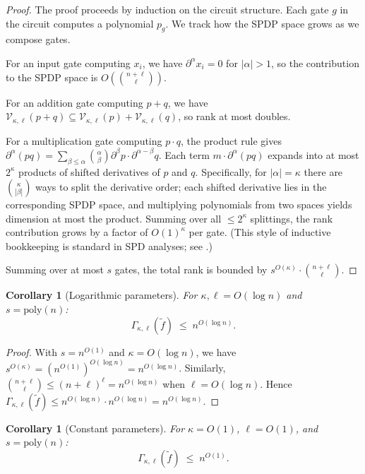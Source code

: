 \documentclass[12pt]{article}
\newtheorem{corollary}[theorem]{Corollary}
\theoremstyle{definition}
\theoremstyle{remark}
\newcommand{\poly}{\mathrm{poly}}
\newcommand{\SPDPspace}{\mathcal{V}}
\newcommand{\rankSPDP}{\Gamma}
\begin{document}
\begin{proof}
The proof proceeds by induction on the circuit structure. Each gate $g$ in the
circuit computes a polynomial $p_g$. We track how the SPDP space grows as we
compose gates.

For an input gate computing $x_i$, we have $\partial^\alpha x_i = 0$ for
$|\alpha| > 1$, so the contribution to the SPDP space is $O(\binom{n+\ell}{\ell})$.

For an addition gate computing $p + q$, we have
$\SPDPspace_{\kappa,\ell}(p+q) \subseteq \SPDPspace_{\kappa,\ell}(p) + \SPDPspace_{\kappa,\ell}(q)$,
so rank at most doubles.

For a multiplication gate computing $p \cdot q$, the product rule gives
$\partial^\alpha(pq) = \sum_{\beta \le \alpha} \binom{\alpha}{\beta}
\partial^\beta p \cdot \partial^{\alpha-\beta} q$. Each term $m \cdot \partial^\alpha(pq)$
expands into at most $2^{\kappa}$ products of shifted derivatives of $p$ and $q$.
Specifically, for $|\alpha|=\kappa$ there are $\binom{\kappa}{|\beta|}$ ways to split the derivative
order; each shifted derivative lies in the corresponding SPDP space, and multiplying
polynomials from two spaces yields dimension at most the product. Summing over all
$\le 2^{\kappa}$ splittings, the rank contribution grows by a factor of $O(1)^{\kappa}$ per gate.
(This style of inductive bookkeeping is standard in SPD analyses; see \citet{NW1997,SY2010}.)

Summing over at most $s$ gates, the total rank is bounded by $s^{O(\kappa)} \cdot \binom{n+\ell}{\ell}$.
\end{proof}

\begin{corollary}[Logarithmic parameters]
\label{cor:circuit-log-params}
For $\kappa, \ell = O(\log n)$ and $s = \poly(n)$:
\[
\rankSPDP_{\kappa,\ell}(\tilde f) \;\le\; n^{O(\log n)}.
\]
\end{corollary}

\begin{proof}
With $s=n^{O(1)}$ and $\kappa=O(\log n)$, we have $s^{O(\kappa)}=(n^{O(1)})^{O(\log n)}=n^{O(\log n)}$.
Similarly, $\binom{n+\ell}{\ell}\le (n+\ell)^\ell = n^{O(\log n)}$ when $\ell=O(\log n)$.
Hence $\rankSPDP_{\kappa,\ell}(\tilde f)\le n^{O(\log n)}\cdot n^{O(\log n)}=n^{O(\log n)}$.
\end{proof}

\begin{corollary}[Constant parameters]
\label{cor:circuit-const-params}
For $\kappa = O(1)$, $\ell = O(1)$, and $s = \poly(n)$:
\[
\rankSPDP_{\kappa,\ell}(\tilde f) \;\le\; n^{O(1)}.
\]
\end{corollary}
\end{document}
